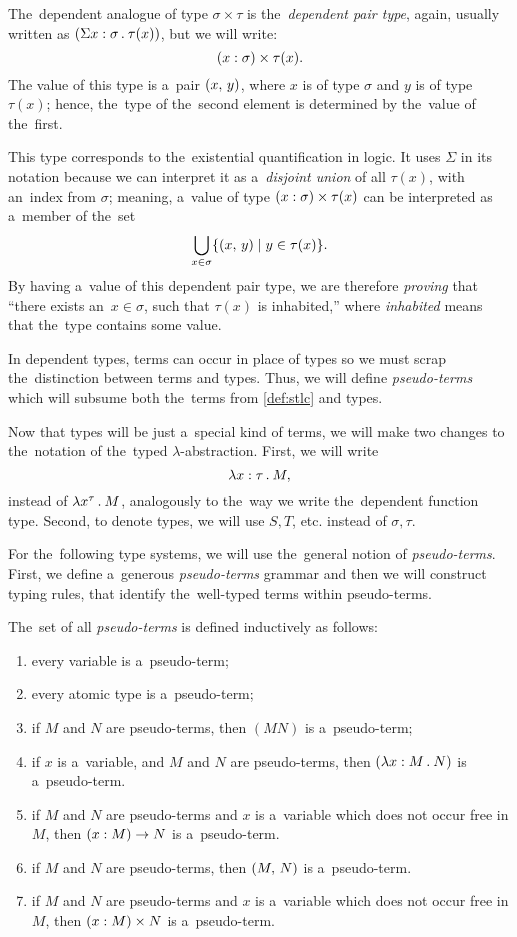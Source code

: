 The~dependent analogue of type $\sigma \times \tau$ is the~\emph{dependent pair
type}, again, usually written as ${(\Sigma x \stackrel{}: \sigma \, . \: \tau(x))}$,
but we will write:
\[
  (x \stackrel{}: \sigma) \times \tau(x).
\]
The value of this type is a~pair $(x, \, y)$, where $x$ is of type $\sigma$ and
$y$ is of type $\tau(x)$; hence, the~type of the~second element is determined by
the~value of the~first.

This type corresponds to the~existential quantification in logic. It uses
$\Sigma$ in its notation because we can interpret it as a~\emph{disjoint union}
of all $\tau(x)$, with an~index from $\sigma$; meaning, a~value of type $(x
\stackrel{}: \sigma) \times \tau(x)$ can be interpreted as a~member of the~set
\[
  \bigcup_{x \in \sigma} \{ (x, \, y) \mid y \in \tau(x) \}.
\]
By having a~value of this dependent pair type, we are therefore \emph{proving}
that ``there exists an~$x \in \sigma$, such that $\tau(x)$ is inhabited,'' where
\emph{inhabited} means that the~type contains some value.

In dependent types, terms can occur in place of types so we must scrap
the~distinction between terms and types. Thus, we will define
\emph{pseudo-terms} which will subsume both the~terms from \autoref{def:stlc}
and types.

Now that types will be just a~special kind of terms, we will make two changes to
the~notation of the~typed $\lambda$-abstraction. First, we will write
\[
  \lambda x \stackrel{}: \tau \, . \: M,
\]
instead of $\lambda x^\tau \, . \: M$, analogously to the~way we write the~dependent
function type. Second, to denote types, we will use $S, T$, etc. instead of
$\sigma, \tau.$


For the~following type systems, we will use the~general notion of
\emph{pseudo-terms}. First, we define a~generous \emph{pseudo-terms} grammar and
then we will construct typing rules, that identify the~well-typed terms within
pseudo-terms.

\begin{definition}\label{def:pseudo-term}
  The~set of all \emph{pseudo-terms} is defined inductively as follows:
  \begin{enumerate}
    \item every variable is a~pseudo-term;
    \item every atomic type is a~pseudo-term;
    \item if $M$ and $N$ are pseudo-terms, then $(M N)$ is a~pseudo-term;
    \item if $x$ is a~variable, and $M$ and $N$ are pseudo-terms, then
      $(\lambda x \stackrel{}: M \, . \: N)$ is a~pseudo-term.
    \item if $M$ and $N$ are pseudo-terms and $x$ is a~variable which does not
      occur free in $M$, then $(x : M) \to N$ is a~pseudo-term.
    \item if $M$ and $N$ are pseudo-terms, then $(M, \, N)$ is a~pseudo-term.
    \item if $M$ and $N$ are pseudo-terms and $x$ is a~variable which does not
      occur free in $M$, then $(x \stackrel{}: M) \times N$ is a~pseudo-term.
  \end{enumerate}
\end{definition}

